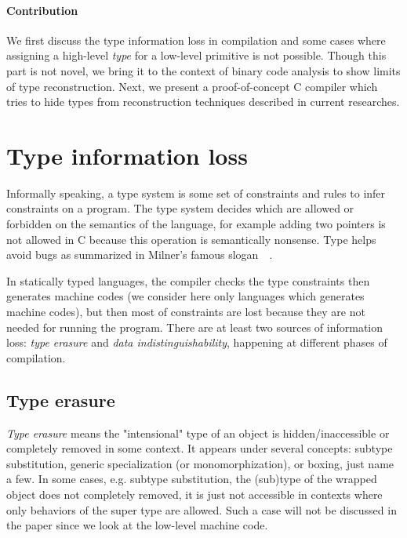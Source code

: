 \documentclass[a4paper]{llncs}
\begin{document}

\paragraph{Contribution}
We first discuss the type information loss in compilation and some cases
where assigning a high-level \emph{type} for a low-level primitive
is not possible. Though this part is not novel, we bring it to the context
of binary code analysis to show limits of type reconstruction. Next, we present
a proof-of-concept C compiler which tries to hide types from reconstruction techniques described
in current researches.

\section{Type information loss}
Informally speaking, a type system is some set of constraints and rules to infer constraints
on a program. The type system decides which are allowed or forbidden on the semantics of the language,
for example adding two pointers is not allowed in C because this operation is semantically nonsense.
Type helps avoid bugs as summarized in Milner's famous
slogan~~\cite{milner_theory_1978}.

In statically typed languages, the compiler checks the type constraints then generates
machine codes (we consider here only languages which generates machine codes), but then
most of constraints are lost because they are not needed for running
the program. There are at least two sources of
information loss: \emph{type erasure} and \emph{data indistinguishability},
happening at different phases of compilation.

\subsection{Type erasure}
\emph{Type erasure} means the "intensional" type of an object is hidden/inaccessible or
completely removed in some context. It appears under several concepts: subtype substitution,
generic specialization (or monomorphization), or boxing, just name a few. In some cases,
e.g. subtype substitution, the (sub)type of the wrapped object does not completely removed,
it is just not accessible in contexts where only behaviors of the super type are allowed.
Such a case will not be discussed in the paper since we look at the low-level machine code.
\end{document}

